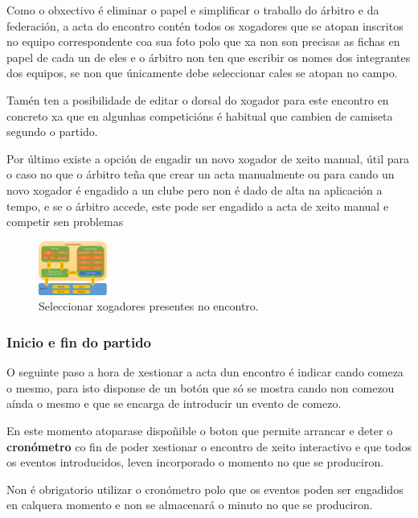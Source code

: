       Como o obxectivo é eliminar o papel e simplificar o traballo do árbitro 
e da federación, a acta do encontro contén todos os xogadores que 
se atopan inscritos no equipo correspondente coa sua foto polo que xa non son 
precisas as fichas en papel de cada un de eles e o árbitro non ten que escribir 
os nomes dos integrantes dos equipos, se non que únicamente debe seleccionar 
cales se atopan no campo.

      Tamén ten a posibilidade de editar o dorsal do xogador para este encontro 
en concreto xa que en algunhas competicións é habitual que cambien de camiseta 
segundo o partido.

      Por último existe a opción de engadir un novo xogador de xeito 
manual, útil para o caso no que o árbitro teña que crear un acta manualmente ou 
para cando un novo xogador é engadido a un clube pero non é dado de alta na 
aplicación a tempo, e se o árbitro accede, este pode ser engadido a acta de 
xeito manual e competir sen problemas

    \begin{figure}[h!]
      \begin{center}
      \includegraphics[width=0.2\textwidth]{./img/cordova_arquitectura.png}
      \caption{Seleccionar xogadores presentes no encontro.}
      \end{center}
    \end{figure}

      \subsubsection{Inicio e fin do partido}
      O seguinte paso a hora de xestionar a acta dun encontro é indicar cando 
comeza o mesmo, para isto disponse de un botón que só se mostra cando non 
comezou aínda o mesmo e que se encarga de introducir un evento de comezo.

      En este momento atoparase dispoñible o boton que permite arrancar e deter 
o \textbf{cronómetro} co fin de poder xestionar o encontro de xeito interactivo 
e que todos os eventos introducidos, leven incorporado o momento no que se 
produciron.

      Non é obrigatorio utilizar o cronómetro polo que os eventos poden ser 
engadidos en calquera momento e non se almacenará o minuto no que se produciron.


